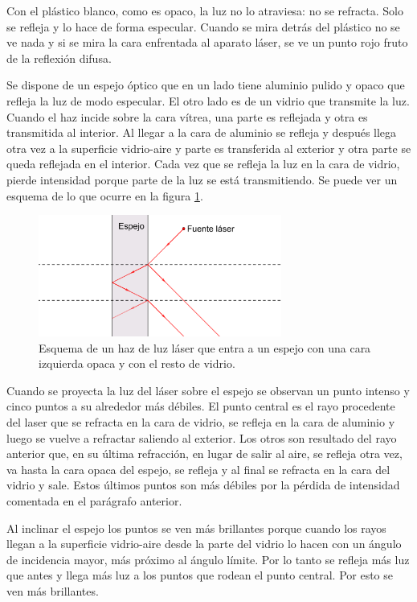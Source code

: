 \documentclass[12pt]{article}
\numberwithin{table}{section}
\numberwithin{figure}{section}
\numberwithin{equation}{section}
\begin{document}
Con el plástico blanco, como es opaco, la luz no lo atraviesa: no se refracta. Solo se refleja y lo hace de forma especular. Cuando se mira detrás del plástico no se ve nada y si se mira la cara enfrentada al aparato láser, se ve un punto rojo fruto de la reflexión difusa.

Se dispone de un espejo óptico que en un lado tiene aluminio pulido y opaco que refleja la luz de modo especular. El otro lado es de un vidrio que transmite la luz. Cuando el haz incide sobre la cara vítrea, una parte es reflejada y otra es transmitida al interior. Al llegar a la cara de aluminio se refleja y después llega otra vez a la superficie vidrio-aire y parte es transferida al exterior y otra parte se queda reflejada en el interior. Cada vez que se refleja la luz en la cara de vidrio, pierde intensidad porque parte de la luz se está transmitiendo. Se puede ver un esquema de lo que ocurre en la figura \ref{P2espejo}.

\begin{figure}[!ht]
	\small \centering \sffamily
	\begin{center}
		\includegraphics[width=8cm]{P2Espejo.png}
		\caption{Esquema de un haz de luz láser que entra a un espejo con una cara izquierda opaca y con el resto de vidrio.}
		\label{P2espejo}
	\end{center}
\end{figure}

Cuando se proyecta la luz del láser sobre el espejo se observan un punto intenso y cinco puntos a su alrededor más débiles. El punto central es el rayo procedente del laser que se refracta en la cara de vidrio, se refleja en la cara de aluminio y luego se vuelve a refractar saliendo al exterior. Los otros son resultado del rayo anterior que, en su última refracción, en lugar de salir al aire, se refleja otra vez, va hasta la cara opaca del espejo, se refleja y al final se refracta en la cara del vidrio y sale. Estos últimos puntos son más débiles por la pérdida de intensidad comentada en el parágrafo anterior.

Al inclinar el espejo los puntos se ven más brillantes porque cuando los rayos llegan a la superficie vidrio-aire desde la parte del vidrio lo hacen con un ángulo de incidencia mayor, más próximo al ángulo límite. Por lo tanto se refleja más luz que antes y llega más luz a los puntos que rodean el punto central. Por esto se ven más brillantes.
\end{document}
